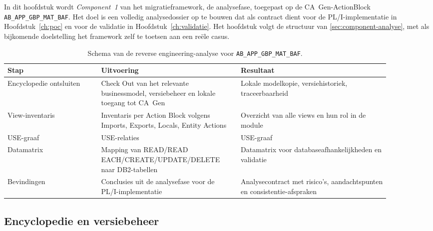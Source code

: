 
\chapter{}%
\label{ch:reverse-engineering}

In dit hoofdstuk wordt \emph{Component~1} van het migratieframework, de analysefase, toegepast op de
CA~Gen-ActionBlock \texttt{AB\_APP\_GBP\_MAT\_BAF}. Het doel is een volledig analysedossier op te bouwen dat als contract dient
voor de PL/I-implementatie in Hoofdstuk~\ref{ch:poc} en voor de validatie in Hoofdstuk~\ref{ch:validatie}.
Het hoofdstuk volgt de structuur van \autoref{sec:component-analyse}, met als bijkomende doelstelling het
framework zelf te toetsen aan een re\"ele casus.

\begin{table}[h]
\centering
\caption[Schema reverse engineering]{Schema van de reverse engineering-analyse voor \texttt{AB\_APP\_GBP\_MAT\_BAF}.}
\label{tab:re-schema}
\small
\begin{tabular}{|p{0.22\linewidth}|p{0.32\linewidth}|p{0.35\linewidth}|}
\hline
\textbf{Stap} & \textbf{Uitvoering} & \textbf{Resultaat} \\
\hline
Encyclopedie ontsluiten & Check Out van het relevante businessmodel, versiebeheer en lokale toegang tot CA~Gen & Lokale modelkopie, versiehistoriek, traceerbaarheid \\
\hline
View-inventaris & Inventaris per Action Block volgens Imports, Exports, Locals, Entity Actions & Overzicht van alle views en hun rol in de module \\
\hline
USE-graaf & USE-relaties & USE-graaf \\
\hline
Datamatrix & Mapping van READ/READ EACH/CREATE/UPDATE/DELETE naar DB2-tabellen & Datamatrix voor databaseafhankelijkheden en validatie \\
\hline
Bevindingen & Conclusies uit de analysefase voor de PL/I-implementatie & Analysecontract met risico's, aandachtspunten en consistentie-afspraken \\
\hline
\end{tabular}
\end{table}

\section{Encyclopedie en versiebeheer}
\label{sec:re-encyclopedie}

